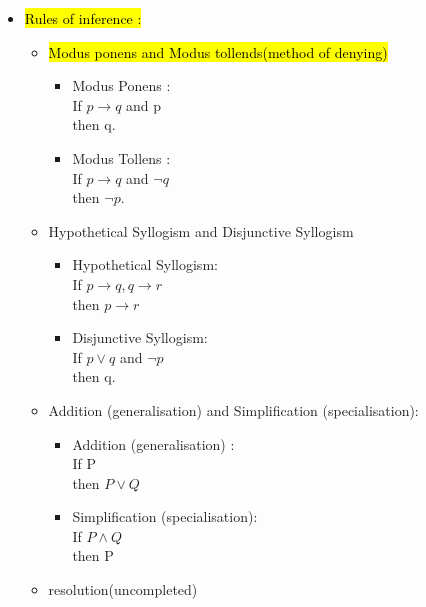 \documentclass{article}
\begin{document}
\begin{itemize}
\item \hl{Rules of inference : }
\begin{itemize}

\item \hl{Modus ponens and Modus tollends(method of denying)}
\begin{itemize}

\item Modus Ponens :\\
If $p \rightarrow q$ and p \\
then q.

\item Modus Tollens :\\
If $p \rightarrow q$ and $\neg q$ \\
then $\neg p$.

\end{itemize}
\item Hypothetical Syllogism and Disjunctive Syllogism

\begin{itemize}
\item Hypothetical Syllogism:\\
If $p \rightarrow q , q \rightarrow r$\\
then $p \rightarrow r$ 

\item Disjunctive Syllogism:\\
If $p \lor q$ and $\neg p$\\
then q.

\end{itemize}
\item Addition (generalisation) and Simplification (specialisation):

\begin{itemize} 

\item Addition (generalisation) : \\
If P\\
then $P \lor Q$

\item Simplification (specialisation):\\
If  $P \land Q$\\
then  P
\end{itemize}
\item resolution(uncompleted)
\end{itemize} 


\end{itemize}
\end{document}
